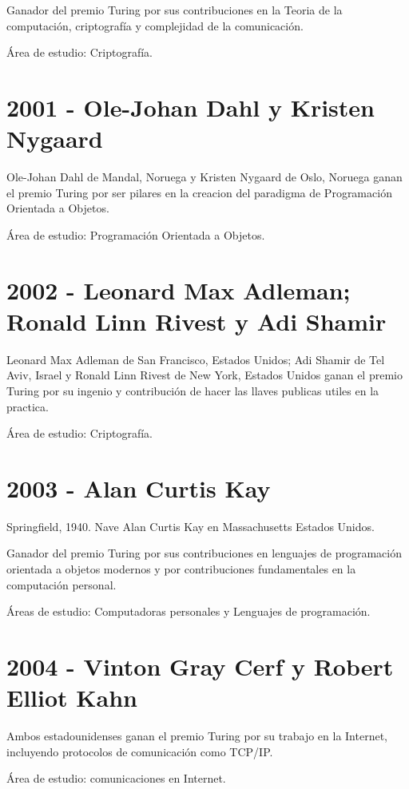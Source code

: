 \documentclass[a4paper, 11pt]{article}
\begin{document}
\noindent Ganador del premio Turing por sus contribuciones en la Teoria de la computación, criptografía y complejidad de la comunicación.

\noindent Área de estudio: Criptografía. 
\newline


\section*{2001 - Ole-Johan Dahl y Kristen Nygaard}
\noindent Ole-Johan Dahl de Mandal, Noruega y Kristen Nygaard  de Oslo, Noruega  ganan el premio Turing por ser pilares en la creacion del paradigma de Programación Orientada a Objetos.

\noindent Área de estudio: Programación Orientada a Objetos.
\newline

\section*{2002 - Leonard Max Adleman; Ronald Linn Rivest y Adi Shamir}
\noindent Leonard Max Adleman de San Francisco, Estados Unidos; Adi Shamir de Tel Aviv, Israel y  Ronald Linn Rivest de New York, Estados Unidos  ganan el premio Turing por su ingenio y contribución de hacer las llaves publicas utiles en la practica.

\noindent Área de estudio: Criptografía.
\newline

\section*{2003 - Alan Curtis Kay}
\noindent Springfield, 1940. Nave Alan Curtis Kay en Massachusetts Estados Unidos.

\noindent Ganador del premio Turing por sus contribuciones en lenguajes de programación orientada a objetos modernos y por contribuciones fundamentales en la computación personal.

\noindent Áreas de estudio: Computadoras personales y Lenguajes de programación.
\newline

\section*{2004 - Vinton Gray Cerf y Robert Elliot Kahn}
\noindent Ambos estadounidenses  ganan el premio Turing por su trabajo en la Internet, incluyendo protocolos de comunicación como TCP/IP.

\noindent Área de estudio: comunicaciones en Internet.
\newline
\end{document}
